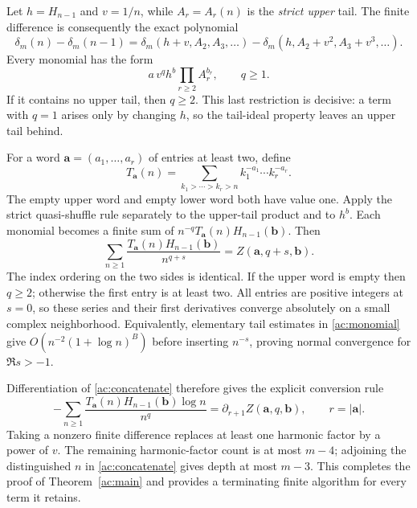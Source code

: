 Let $h=H_{n-1}$ and $v=1/n$, while $A_r=A_r(n)$ is the
\emph{strict upper} tail. The finite difference is consequently
the exact polynomial
\begin{equation}\label{ac:delta-rule}
 \delta_m(n)-\delta_m(n-1)
 =\delta_m(h+v,A_2,A_3,\ldots)
   -\delta_m(h,A_2+v^2,A_3+v^3,\ldots).
\end{equation}
Every monomial has the form
\begin{equation}\label{ac:monomial}
 a\,v^q h^b\prod_{r\ge2}A_r^{b_r},\qquad q\ge1.
\end{equation}
If it contains no upper tail, then $q\ge2$. This last restriction
is decisive: a term with $q=1$ arises only by changing $h$, so
the tail-ideal property leaves an upper tail behind.

For a word $\mathbf a=(a_1,\ldots,a_r)$ of entries at least two,
define
\[
 T_{\mathbf a}(n)=\sum_{k_1>\cdots>k_r>n}
                        k_1^{-a_1}\cdots k_r^{-a_r}.
\]
The empty upper word and empty lower word both have value one.
Apply the strict quasi-shuffle rule separately to the upper-tail
product and to $h^b$. Each monomial becomes a finite sum of
$n^{-q}T_{\mathbf a}(n)H_{n-1}(\mathbf b)$. Then
\begin{equation}\label{ac:concatenate}
 \sum_{n\ge1}\frac{T_{\mathbf a}(n)H_{n-1}(\mathbf b)}{n^{q+s}}
       =Z(\mathbf a,q+s,\mathbf b).
\end{equation}
The index ordering on the two sides is identical. If the upper word
is empty then $q\ge2$; otherwise the first entry is at least two.
All entries are positive integers at $s=0$, so these series and
their first derivatives converge absolutely on a small complex
neighborhood. Equivalently, elementary tail estimates in
\eqref{ac:monomial} give $O(n^{-2}(1+\log n)^B)$ before
inserting $n^{-s}$, proving normal convergence for $\Re s>-1$.

Differentiation of \eqref{ac:concatenate} therefore gives the
explicit conversion rule
\begin{equation}\label{ac:marked-rule}
 -\sum_{n\ge1}\frac{T_{\mathbf a}(n)H_{n-1}(\mathbf b)\log n}{n^q}
 =\partial_{r+1}Z(\mathbf a,q,\mathbf b),\qquad r=|\mathbf a|.
\end{equation}
Taking a nonzero finite difference replaces at least one harmonic
factor by a power of $v$. The remaining harmonic-factor count is
at most $m-4$; adjoining the distinguished $n$ in
\eqref{ac:concatenate} gives depth at most $m-3$.
This completes the proof of Theorem~\ref{ac:main} and provides a
terminating finite algorithm for every term it retains.

